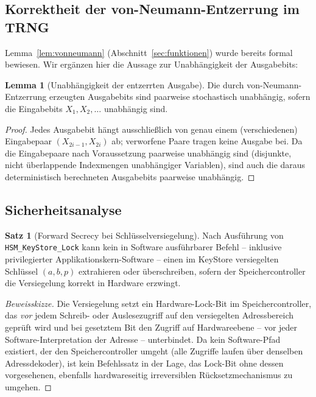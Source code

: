 ﻿\documentclass[a4paper,12pt]{article}
\theoremstyle{definition}
\newtheorem{satz}{Satz}
\newtheorem{lemma}{Lemma}
\begin{document}
\subsection{Korrektheit der von-Neumann-Entzerrung im TRNG}

Lemma~\ref{lem:vonneumann} (Abschnitt~\ref{sec:funktionen}) wurde bereits formal bewiesen. Wir ergänzen hier die Aussage zur Unabhängigkeit der Ausgabebits:

\begin{lemma}[Unabhängigkeit der entzerrten Ausgabe]
	\label{lem:unabh}
	Die durch von-Neumann-Entzerrung erzeugten Ausgabebits sind paarweise stochastisch unabhängig, sofern die Eingabebits $X_1, X_2, \ldots$ unabhängig sind.
\end{lemma}

\begin{proof}
	Jedes Ausgabebit hängt ausschließlich von genau einem (verschiedenen) Eingabepaar $(X_{2i-1}, X_{2i})$ ab; verworfene Paare tragen keine Ausgabe bei. Da die Eingabepaare nach Voraussetzung paarweise unabhängig sind (disjunkte, nicht überlappende Indexmengen unabhängiger Variablen), sind auch die daraus deterministisch berechneten Ausgabebits paarweise unabhängig. \qedhere
\end{proof}

\subsection{Sicherheitsanalyse}

\begin{satz}[Forward Secrecy bei Schlüsselversiegelung]
	\label{satz:forward-secrecy}
	Nach Ausführung von \texttt{HSM\_KeyStore\_Lock} kann kein in Software ausführbarer Befehl -- inklusive privilegierter Applikationskern-Software -- einen im KeyStore versiegelten Schlüssel $(a,b,p)$ extrahieren oder überschreiben, sofern der Speichercontroller die Versiegelung korrekt in Hardware erzwingt.
\end{satz}

\begin{proof}[Beweisskizze]
	Die Versiegelung setzt ein Hardware-Lock-Bit im Speichercontroller, das \emph{vor} jedem Schreib- oder Auslesezugriff auf den versiegelten Adressbereich geprüft wird und bei gesetztem Bit den Zugriff auf Hardwareebene -- vor jeder Software-Interpretation der Adresse -- unterbindet. Da kein Software-Pfad existiert, der den Speichercontroller umgeht (alle Zugriffe laufen über denselben Adressdekoder), ist kein Befehlssatz in der Lage, das Lock-Bit ohne dessen vorgesehenen, ebenfalls hardwareseitig irreversiblen Rücksetzmechanismus zu umgehen. \qedhere
\end{proof}
\end{document}
